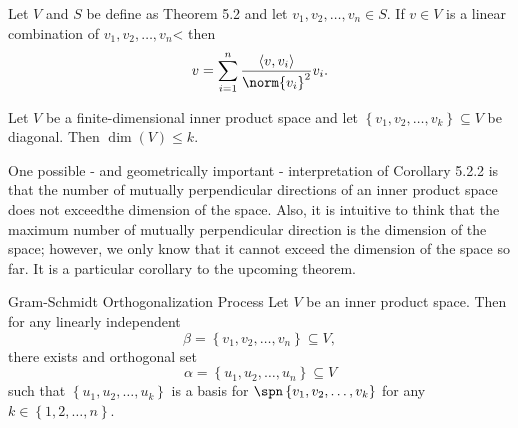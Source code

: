 \documentclass[linearalgebraII]{subfiles}
\begin{document}
    \begin{cor}{}
        Let $V$ and $S$ be define as Theorem 5.2 and let $v_1,v_2,\ldots,v_n\in S$. If $v\in V$ is a linear combination of $v_1,v_2,\ldots,v_n$< then
        \begin{equation*}
            v = \sum^{n}_{i=1} \frac{\left\langle v, v_i\right\rangle }{\norm{v_i}^2} v_i.
        \end{equation*}
    \end{cor}	

    \begin{cor}{}
        Let $V$ be a finite-dimensional inner product space and let $\left\lbrace v_1,v_2,\ldots,v_k \right\rbrace \subseteq V$ be diagonal. Then $\dim(V) \leq k$.
    \end{cor}	

    \begin{remark}
        One possible - and geometrically important - interpretation of Corollary 5.2.2 is that the number of mutually perpendicular directions of an inner product space does not exceedthe dimension of the space. Also, it is intuitive to think that the maximum number of mutually perpendicular direction is the dimension of the space; however, we only know that it cannot exceed the dimension of the space so far. It is a particular corollary to the upcoming theorem.
    \end{remark}

    \clearpage
    \begin{theorem}{Gram-Schmidt Orthogonalization Process}
        Let $V$ be an inner product space. Then for any linearly independent
        \begin{equation*}
            \beta = \left\lbrace v_1,v_2,\ldots,v_n \right\rbrace \subseteq V,
        \end{equation*}
        there exists and orthogonal set
        \begin{equation*}
            \alpha = \left\lbrace u_1, u_2, \ldots, u_n \right\rbrace \subseteq V
        \end{equation*}
        such that $\left\lbrace u_1,u_2,\ldots,u_k \right\rbrace$ is a basis for $\spn\left\lbrace v_1,v_2,\ldots,v_k \right\rbrace$ for any $k\in\left\lbrace 1,2,\ldots,n \right\rbrace$.
    \end{theorem}
\end{document}
